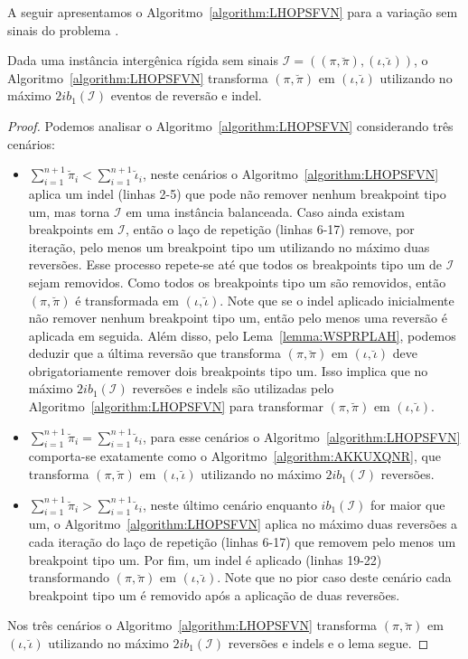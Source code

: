 A seguir apresentamos o Algoritmo~\ref{algorithm:LHOPSFVN} para a variação sem sinais do problema \SbIRI{}.



\begin{lemma}\label{lemma:XUDIVWPC}
Dada uma instância intergênica rígida sem sinais $\mathcal{I}=((\pi,\breve\pi),(\iota,\breve\iota))$, o Algoritmo~\ref{algorithm:LHOPSFVN} transforma $(\pi,\breve\pi)$ em $(\iota,\breve\iota)$ utilizando no máximo $2ib_1(\mathcal{I})$ eventos de reversão e indel.
\end{lemma}
\begin{proof}
  Podemos analisar o Algoritmo~\ref{algorithm:LHOPSFVN} considerando três cenários:
  \begin{itemize}
    \item $\sum_{i=1}^{n+1}\breve\pi_i < \sum_{i=1}^{n+1}\breve\iota_i$, neste cenários o Algoritmo~\ref{algorithm:LHOPSFVN} aplica um indel (linhas 2-5) que pode não remover nenhum breakpoint tipo um, mas torna $\mathcal{I}$ em uma instância balanceada. Caso ainda existam breakpoints em $\mathcal{I}$, então o laço de repetição (linhas 6-17) remove, por iteração, pelo menos um breakpoint tipo um utilizando no máximo duas reversões. Esse processo repete-se até que todos os breakpoints tipo um de $\mathcal{I}$ sejam removidos. Como todos os breakpoints tipo um são removidos, então $(\pi,\breve\pi)$ é transformada em $(\iota,\breve\iota)$. Note que se o indel aplicado inicialmente não remover nenhum breakpoint tipo um, então pelo menos uma reversão é aplicada em seguida. Além disso, pelo Lema~\ref{lemma:WSPRPLAH}, podemos deduzir que a última reversão que transforma $(\pi,\breve\pi)$ em $(\iota,\breve\iota)$ deve obrigatoriamente remover dois breakpoints tipo um. Isso implica que no máximo $2ib_1(\mathcal{I})$ reversões e indels são utilizadas pelo Algoritmo~\ref{algorithm:LHOPSFVN} para transformar $(\pi,\breve\pi)$ em $(\iota,\breve\iota)$.
    \item $\sum_{i=1}^{n+1}\breve\pi_i = \sum_{i=1}^{n+1}\breve\iota_i$, para esse cenários o Algoritmo~\ref{algorithm:LHOPSFVN} comporta-se exatamente como o Algoritmo~\ref{algorithm:AKKUXQNR}, que transforma $(\pi,\breve\pi)$ em $(\iota,\breve\iota)$ utilizando no máximo $2ib_1(\mathcal{I})$ reversões.
    \item $\sum_{i=1}^{n+1}\breve\pi_i > \sum_{i=1}^{n+1}\breve\iota_i$, neste último cenário enquanto $ib_1(\mathcal{I})$ for maior que um, o Algoritmo~\ref{algorithm:LHOPSFVN} aplica no máximo duas reversões a cada iteração do laço de repetição (linhas 6-17) que removem pelo menos um breakpoint tipo um. Por fim, um indel é aplicado (linhas 19-22) transformando $(\pi,\breve\pi)$ em $(\iota,\breve\iota)$. Note que no pior caso deste cenário cada breakpoint tipo um é removido após a aplicação de duas reversões.
  \end{itemize}
  Nos três cenários o Algoritmo~\ref{algorithm:LHOPSFVN} transforma $(\pi,\breve\pi)$ em $(\iota,\breve\iota)$ utilizando no máximo $2ib_1(\mathcal{I})$ reversões e indels e o lema segue.
\end{proof}

